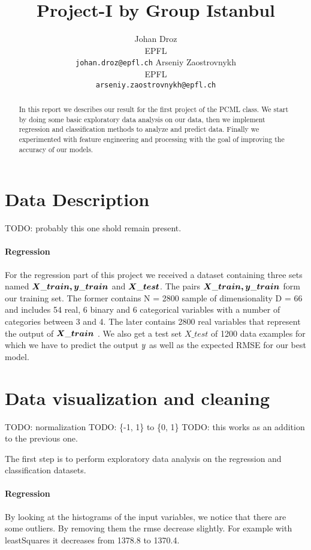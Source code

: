 \documentclass{article} %
\title{Project-I by Group Istanbul}
\author{
Johan Droz\\
EPFL \\
\texttt{johan.droz@epfl.ch} \And
Arseniy Zaostrovnykh\\
EPFL \\
\texttt{arseniy.zaostrovnykh@epfl.ch}
}
\newcommand{\todo}[1]{}
\renewcommand{\todo}[1]{{\color{red} TODO: {#1}}}
\begin{document}
\maketitle

\begin{abstract}
In this report we describes our result for the first project of the PCML class.
We start by doing some basic exploratory data analysis on our data, then we implement regression and classification methods to analyze and predict data.
Finally we experimented with feature engineering and processing with the goal of improving the accuracy of our models.
\end{abstract}

\section{Data Description}
\todo{probably this one shold remain present.}
\paragraph{Regression} For the regression part of this project we received a dataset containing three sets named $\boldmath{X\_train, y\_train}$ and $\boldmath{X\_test}$. The pairs $\boldmath{X\_train, y\_train}$  form our training set. 
The former contains N = 2800 sample of dimensionality D = 66 and includes 54 real, 6 binary and 6 categorical variables with a number of categories between 3 and 4.
The later contains 2800 real variables that represent the output of $\boldmath{X\_train}$ .
We also get a test set $X\_test$ of 1200 data examples for which we have to predict the output $\boldmath{y}$ as well as the expected RMSE for our best model.

\section{Data visualization and cleaning}
\todo{normalization}
\todo{\{-1, 1\} to \{0, 1\}}
\todo{this works as an addition to the previous one.}

The first step is to perform exploratory data analysis on the regression and classification datasets.
\paragraph{Regression} 
By looking at the histograms of the input variables, we notice that there are some outliers. By removing them the rmse decrease slightly.
For example with leastSquares it decreases from 1378.8 to 1370.4.
\end{document}

